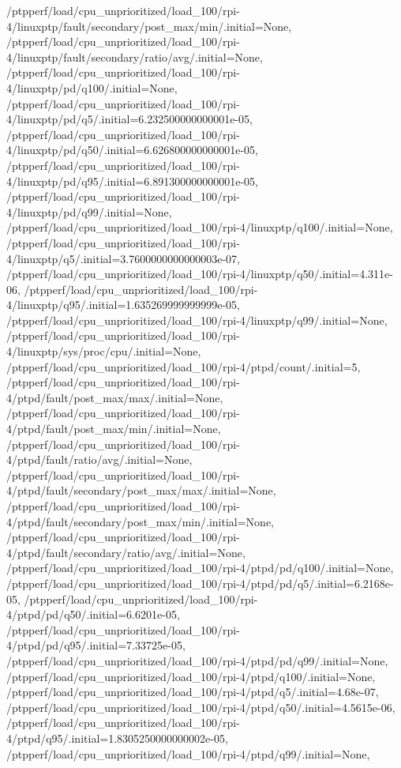{    /ptpperf/load/cpu_unprioritized/load_100/rpi-4/linuxptp/fault/secondary/post_max/min/.initial=None,
    /ptpperf/load/cpu_unprioritized/load_100/rpi-4/linuxptp/fault/secondary/ratio/avg/.initial=None,
    /ptpperf/load/cpu_unprioritized/load_100/rpi-4/linuxptp/pd/q100/.initial=None,
    /ptpperf/load/cpu_unprioritized/load_100/rpi-4/linuxptp/pd/q5/.initial=6.232500000000001e-05,
    /ptpperf/load/cpu_unprioritized/load_100/rpi-4/linuxptp/pd/q50/.initial=6.626800000000001e-05,
    /ptpperf/load/cpu_unprioritized/load_100/rpi-4/linuxptp/pd/q95/.initial=6.891300000000001e-05,
    /ptpperf/load/cpu_unprioritized/load_100/rpi-4/linuxptp/pd/q99/.initial=None,
    /ptpperf/load/cpu_unprioritized/load_100/rpi-4/linuxptp/q100/.initial=None,
    /ptpperf/load/cpu_unprioritized/load_100/rpi-4/linuxptp/q5/.initial=3.7600000000000003e-07,
    /ptpperf/load/cpu_unprioritized/load_100/rpi-4/linuxptp/q50/.initial=4.311e-06,
    /ptpperf/load/cpu_unprioritized/load_100/rpi-4/linuxptp/q95/.initial=1.635269999999999e-05,
    /ptpperf/load/cpu_unprioritized/load_100/rpi-4/linuxptp/q99/.initial=None,
    /ptpperf/load/cpu_unprioritized/load_100/rpi-4/linuxptp/sys/proc/cpu/.initial=None,
    /ptpperf/load/cpu_unprioritized/load_100/rpi-4/ptpd/count/.initial=5,
    /ptpperf/load/cpu_unprioritized/load_100/rpi-4/ptpd/fault/post_max/max/.initial=None,
    /ptpperf/load/cpu_unprioritized/load_100/rpi-4/ptpd/fault/post_max/min/.initial=None,
    /ptpperf/load/cpu_unprioritized/load_100/rpi-4/ptpd/fault/ratio/avg/.initial=None,
    /ptpperf/load/cpu_unprioritized/load_100/rpi-4/ptpd/fault/secondary/post_max/max/.initial=None,
    /ptpperf/load/cpu_unprioritized/load_100/rpi-4/ptpd/fault/secondary/post_max/min/.initial=None,
    /ptpperf/load/cpu_unprioritized/load_100/rpi-4/ptpd/fault/secondary/ratio/avg/.initial=None,
    /ptpperf/load/cpu_unprioritized/load_100/rpi-4/ptpd/pd/q100/.initial=None,
    /ptpperf/load/cpu_unprioritized/load_100/rpi-4/ptpd/pd/q5/.initial=6.2168e-05,
    /ptpperf/load/cpu_unprioritized/load_100/rpi-4/ptpd/pd/q50/.initial=6.6201e-05,
    /ptpperf/load/cpu_unprioritized/load_100/rpi-4/ptpd/pd/q95/.initial=7.33725e-05,
    /ptpperf/load/cpu_unprioritized/load_100/rpi-4/ptpd/pd/q99/.initial=None,
    /ptpperf/load/cpu_unprioritized/load_100/rpi-4/ptpd/q100/.initial=None,
    /ptpperf/load/cpu_unprioritized/load_100/rpi-4/ptpd/q5/.initial=4.68e-07,
    /ptpperf/load/cpu_unprioritized/load_100/rpi-4/ptpd/q50/.initial=4.5615e-06,
    /ptpperf/load/cpu_unprioritized/load_100/rpi-4/ptpd/q95/.initial=1.8305250000000002e-05,
    /ptpperf/load/cpu_unprioritized/load_100/rpi-4/ptpd/q99/.initial=None,
}
